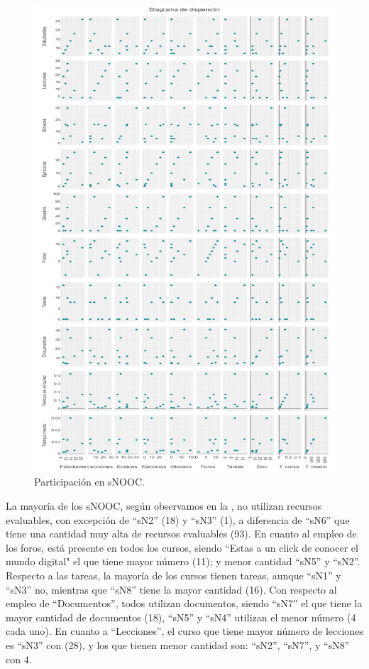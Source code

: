 \begin{figure}[htbp]
\centering
\begin{minipage}{\textwidth}
\caption{Participación en sNOOC.}
\label{fig-10}
\includegraphics[width=\textwidth]{Imagem10.png}
\end{minipage}
\end{figure}
	
	
La mayoría de los sNOOC, según observamos en la , no utilizan
recursos evaluables, con excepción de ``sN2'' (18) y ``sN3'' (1), a
diferencia de ``sN6'' que tiene una cantidad muy alta de recursos
evaluables (93). En cuanto al empleo de los foros, está presente en
todos los cursos, siendo ``Estas a un click de conocer el mundo digital"
el que tiene mayor número (11); y menor cantidad ``sN5'' y ``sN2''. Respecto
a las tareas, la mayoría de los cursos tienen tareas, aunque ``sN1'' y
``sN3'' no, mientras que ``sN8'' tiene la mayor cantidad (16). Con respecto
al empleo de ``Documentos'', todos utilizan documentos, siendo ``sN7'' el
que tiene la mayor cantidad de documentos (18), ``sN5'' y ``sN4'' utilizan
el menor número (4 cada uno). En cuanto a ``Lecciones'', el curso que
tiene mayor número de lecciones es ``sN3'' con (28), y los que tienen
menor cantidad son: ``sN2'', ``sN7'', y ``sN8'' con 4.
	
